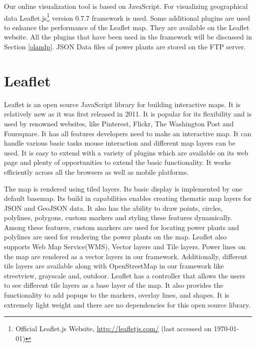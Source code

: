 Our online visualization tool is based on JavaScript. For visualizing geographical data Leaflet.js\footnote{Official Leaflet.js Website, \url{http://leafletjs.com/} (last accessed on \today)} version 0.7.7 framework is used. Some additional plugins are used to enhance the performance of the Leaflet map. They are available on the Leaflet website. All the plugins that have been used in the framework will be discussed in Section \ref{olandp}. JSON Data files of power plants are stored on the FTP server.


\section{Leaflet}

Leaflet is an open source JavaScript library for building interactive maps. It is relatively new as it was first released in 2011. It is popular for its flexibility and is used by renowned websites, like Pinterest, Flickr, The Washington Post and Foursquare. It has all features developers need to make an interactive map. It can handle various basic tasks mouse interaction and different map layers can be used. It is easy to extend with a variety of plugins which are available on its web page and plenty of opportunities to extend the basic functionality. It works efficiently across all the browsers as well as mobile platforms.

The map is rendered using tiled layers. Its basic display is implemented by one default basemap. Its build in capabilities enables creating thematic map layers for JSON and GeoJSON data. It also has the ability to draw points, circles, polylines, polygons, custom markers and styling these features dynamically. Among these features, custom markers are used for locating power plants and polylines are used for rendering the power plants on the map. Leaflet also supports Web Map Service(WMS), Vector layers and Tile layers. Power lines on the map are rendered as a vector layers in our framework. Additionally, different tile layers are available along with OpenStreetMap in our framework like streetview, grayscale and, outdoor. Leaflet has a controller that allows the users to see different tile layers as a base layer of the map. It also provides the functionality to add popups to the markers, overlay lines, and shapes. It is extremely light weight and there are no dependencies for this open source library. 

